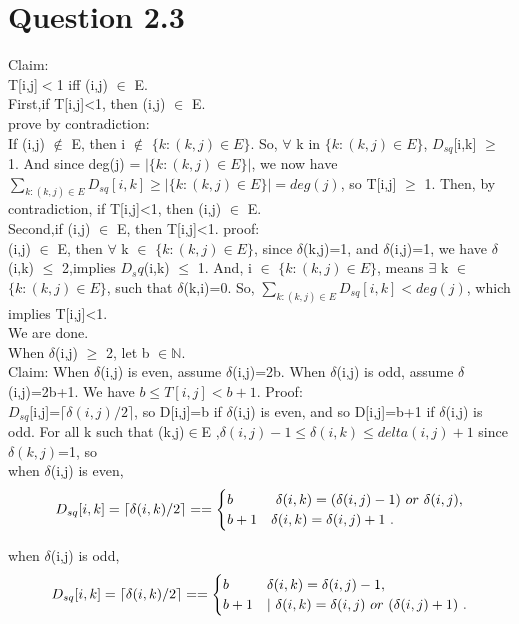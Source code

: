 \documentclass{article}
\begin{document}
\section{Question 2.3}
Claim:\\
T[i,j]$<$1 iff (i,j) $\in$ E.\\
First,if T[i,j]<1, then (i,j) $\in$ E.\\
prove by contradiction:\\
If (i,j) $\notin$ E, then i $\notin$ $\{k:(k,j) \in E\}$. So, $\forall$ k in $\{k:(k,j) \in E\}$, $D_{sq}$[i,k] $\geq$ 1. And since deg(j) =  $|\{k:(k,j) \in E\}|$, we now have $\sum_{k:(k,j) \in E}^{} D_{sq}[i,k] \geq |\{k:(k,j) \in E\}| = deg(j)$, so T[i,j] $\geq$ 1. Then, by contradiction, if T[i,j]<1, then (i,j) $\in$ E.\\
Second,if (i,j) $\in$ E, then T[i,j]<1.
proof:\\
(i,j) $\in$ E, then $\forall$ k $\in$ $\{k:(k,j) \in E\}$, since $\delta$(k,j)=1, and $\delta$(i,j)=1, we have $\delta$(i,k) $\leq$ 2,implies $D_sq$(i,k) $\leq$ 1. And, i $\in$ $\{k:(k,j) \in E\}$, means $\exists$ k $\in$ $\{k:(k,j) \in E\}$, such that $\delta$(k,i)=0. So, $\sum_{k:(k,j) \in E}^{} D_{sq}[i,k] < deg(j)$, which implies T[i,j]<1.\\
We are done.\\
When $\delta$(i,j) $\geq$ 2, let b $\in \mathbb{N}$.\\
Claim: When $\delta$(i,j) is even, assume $\delta$(i,j)=2b. When $\delta$(i,j) is odd, assume $\delta$(i,j)=2b+1. We have $b \leq T[i,j] < b+1$.
Proof:\\
$D_{sq}$[i,j]=$\lceil \delta(i,j)/2 \rceil$, so D[i,j]=b if $\delta$(i,j) is even, and so D[i,j]=b+1 if $\delta$(i,j) is odd.%
For all k such that (k,j)$\in$E ,$\delta(i,j)-1 \leq \delta(i,k) \leq delta(i,j)+1$ since $\delta(k,j)$=1, so \\
when $\delta$(i,j) is even,\\
\[D_{sq}[i,k]=\lceil \delta(i,k)/2 \rceil ==\begin{cases}
b&\text{$ $ $ \delta(i,k)=(\delta(i,j)-1)$ $or$ $\delta(i,j) $},\\
b+1&
\text{$\delta(i,k)=\delta(i,j)+1 $ }.
\end{cases}\]

when $\delta$(i,j) is odd,\\
\[D_{sq}[i,k]=\lceil \delta(i,k)/2 \rceil ==\begin{cases}
b&\text{$  \delta(i,k)=\delta(i,j)-1 $},\\
b+1&
\text{$ | $ $ \delta(i,k)=\delta(i,j)$ $or$ $(\delta(i,j)+1) $ }.
\end{cases}\]
\end{document}
